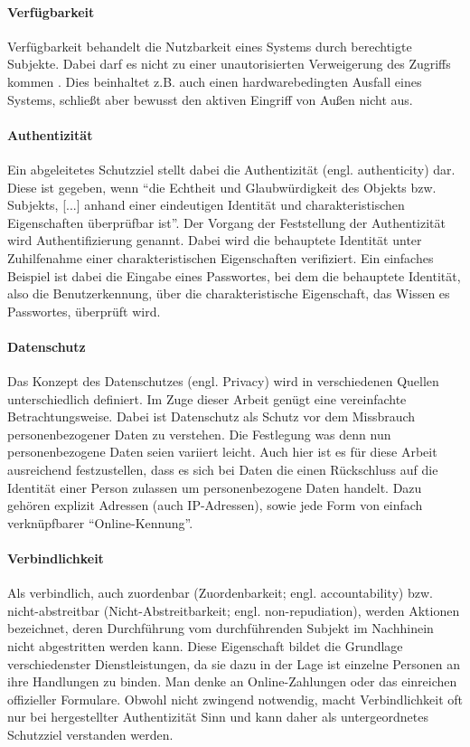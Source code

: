 \paragraph{Verfügbarkeit}
Verfügbarkeit behandelt die Nutzbarkeit eines Systems durch berechtigte Subjekte. Dabei darf es nicht zu einer unautorisierten Verweigerung des Zugriffs kommen \cite[p. 12]{Eckert2013}. Dies beinhaltet z.B. auch einen hardwarebedingten Ausfall eines Systems, schließt aber bewusst den aktiven Eingriff von Außen nicht aus.
 
\paragraph{Authentizität}
Ein abgeleitetes Schutzziel stellt dabei die Authentizität (engl. authenticity) dar. Diese ist gegeben, wenn ``die Echtheit und Glaubwürdigkeit des Objekts bzw. Subjekts, [...] anhand einer eindeutigen Identität und charakteristischen Eigenschaften überprüfbar ist''\cite[p. 8]{Eckert2013}. Der Vorgang der Feststellung der Authentizität wird Authentifizierung genannt. Dabei wird die behauptete Identität unter Zuhilfenahme einer charakteristischen Eigenschaften verifiziert. Ein einfaches Beispiel ist dabei die Eingabe eines Passwortes, bei dem die behauptete Identität, also die Benutzerkennung, über die charakteristische Eigenschaft, das Wissen es Passwortes, überprüft wird.  

\paragraph{Datenschutz}
Das Konzept des Datenschutzes (engl. Privacy) wird in verschiedenen Quellen unterschiedlich definiert. Im Zuge dieser Arbeit genügt eine vereinfachte Betrachtungsweise. Dabei ist Datenschutz als Schutz vor dem Missbrauch personenbezogener Daten zu verstehen. Die Festlegung was denn nun personenbezogene Daten seien variiert leicht. Auch hier ist es für diese Arbeit ausreichend festzustellen, dass es sich bei Daten die einen Rückschluss auf die Identität einer Person zulassen um personenbezogene Daten handelt. Dazu gehören explizit Adressen (auch IP-Adressen), sowie jede Form von einfach verknüpfbarer ``Online-Kennung''\cite{Schwenke2018}.     

\paragraph{Verbindlichkeit}
Als verbindlich, auch zuordenbar (Zuordenbarkeit; engl. accountability) bzw. nicht-abstreitbar (Nicht-Abstreitbarkeit; engl. non-repudiation), werden Aktionen bezeichnet, deren Durchführung vom durchführenden Subjekt im Nachhinein nicht abgestritten werden kann. Diese Eigenschaft bildet die Grundlage verschiedenster Dienstleistungen, da sie dazu in der Lage ist einzelne Personen an ihre Handlungen zu binden. Man denke an Online-Zahlungen oder das einreichen offizieller Formulare. Obwohl nicht zwingend notwendig, macht Verbindlichkeit oft nur bei hergestellter Authentizität Sinn und kann daher als untergeordnetes Schutzziel verstanden werden.

